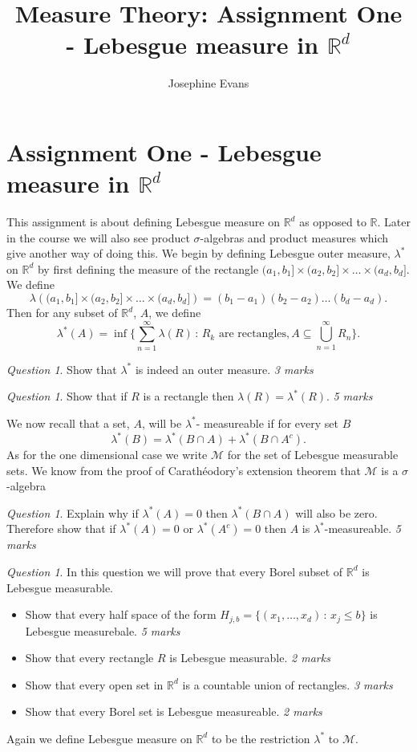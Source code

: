 \documentclass[11pt]{article}
\author{
Josephine Evans
}
\title{Measure Theory: Assignment One - Lebesgue measure in $\mathbb{R}^d$}
\theoremstyle{definition}
\theoremstyle{remark}
\newtheorem{q}[thm]{Question}
\begin{document}
	\section{Assignment One - Lebesgue measure in $\mathbb{R}^d$}
This assignment is about defining Lebesgue measure on $\mathbb{R}^d$ as opposed to $\mathbb{R}$. Later in the course we will also see product $\sigma$-algebras and product measures which give another way of doing this. We begin by defining Lebesgue outer measure, $\lambda^*$ on $\mathbb{R}^d$ by first defining the measure of the rectangle $(a_1,b_1] \times (a_2, b_2] \times \dots \times (a_d, b_d]$. We define
\[ \lambda \left( (a_1,b_1] \times (a_2, b_2] \times \dots \times (a_d, b_d]\right)  = (b_1-a_1)(b_2-a_2)\dots(b_d-a_d).\] Then for any subset of $\mathbb{R}^d$, $A$, we define
\[ \lambda^*(A) = \inf\{ \sum_{n=1}^\infty \lambda(R) \,:\, \mbox{$R_k$ are rectangles}, A \subseteq \bigcup_{n=1}^\infty R_n \}.  \]
\begin{q}
Show that $\lambda^*$ is indeed an outer measure. \emph{3 marks}
\end{q}

\begin{q}
Show that if $R$ is a rectangle then $\lambda(R) = \lambda^*(R)$. \emph{5 marks}
\end{q}

We now recall that a set, $A$, will be $\lambda^*$- measureable if for every set $B$
\[ \lambda^*(B) = \lambda^*(B \cap A) + \lambda^*(B \cap A^c). \] As for the one dimensional case we write $\mathcal{M}$ for the set of Lebesgue measurable sets. We know from the proof of Carath\'eodory's extension theorem that $\mathcal{M}$ is a $\sigma$-algebra

\begin{q}
Explain why if $\lambda^*(A) =0$ then $\lambda^*(B \cap A)$ will also be zero. Therefore show that if $\lambda^*(A) =0$ or $\lambda^*(A^c) =0$ then $A$ is $\lambda^*$-measureable.  \emph{5 marks}
\end{q}

\begin{q}
In this question we will prove that every Borel subset of $\mathbb{R}^d$ is Lebesgue measurable.
\begin{itemize}
	\item Show that every half space of the form $H_{j,b} = \{ (x_1, \dots, x_d) \,:\, x_j \leq b \}$ is Lebesgue measurebale. \emph{5 marks}
	\item Show that every rectangle $R$ is Lebesgue measurable. \emph{2 marks}
	\item Show that every open set in $\mathbb{R}^d$ is a countable union of rectangles. \emph{3 marks}
	\item Show that every Borel set is Lebesgue measureable. \emph{2 marks}
\end{itemize}
\end{q}
Again we define Lebesgue measure on $\mathbb{R}^d$ to be the restriction $\lambda^*$ to $\mathcal{M}$.
\end{document}

